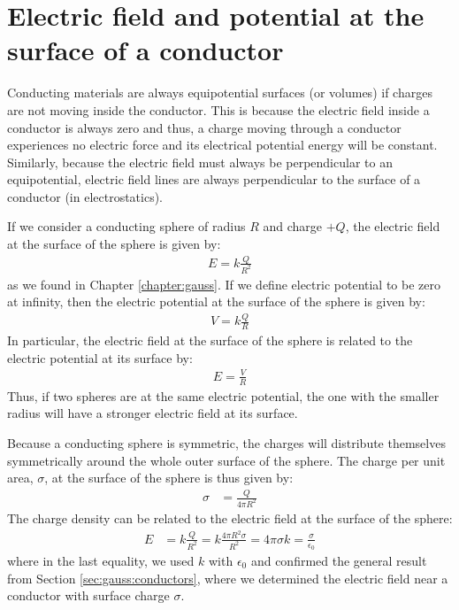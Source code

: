 \section{Electric field and potential at the surface of a conductor}

Conducting materials are always equipotential surfaces (or volumes) if charges are not moving inside the conductor. This is because the electric field inside a conductor is always zero and thus, a charge moving through a conductor experiences no electric force and its electrical potential energy will be constant. Similarly, because the electric field must always be perpendicular to an equipotential, electric field lines are always perpendicular to the surface of a conductor (in electrostatics).

If we consider a conducting sphere of radius $R$ and charge $+Q$, the electric field at the surface of the sphere is given by:
\begin{align*}
E=k\frac{Q}{R^2}
\end{align*}
as we found in Chapter \ref{chapter:gauss}. If we define electric potential to be zero at infinity, then the electric potential at the surface of the sphere is given by:
\begin{align*}
V=k\frac{Q}{R}
\end{align*}
In particular, the electric field at the surface of the sphere is related to the electric potential at its surface by:
\begin{align*}
E=\frac{V}{R}
\end{align*}
Thus, if two spheres are at the same electric potential, the one with the smaller radius will have a stronger electric field at its surface.

Because a conducting sphere is symmetric, the charges will distribute themselves symmetrically around the whole outer surface of the sphere. The charge per unit area, $\sigma$, at the surface of the sphere is thus given by:
\begin{align*}
\sigma &= \frac{Q}{4\pi R^2}
\end{align*}
The charge density can be related to the electric field at the surface of the sphere:
\begin{align*}
E&=k\frac{Q}{R^2}=k\frac{4\pi R^2\sigma}{R^2}=4\pi\sigma k=\frac{\sigma}{\epsilon_0}
\end{align*}
where in the last equality, we used $k$ with $\epsilon_0$ and confirmed the general result from Section \ref{sec:gauss:conductors}, where we determined the electric field near a conductor with surface charge $\sigma$. 


